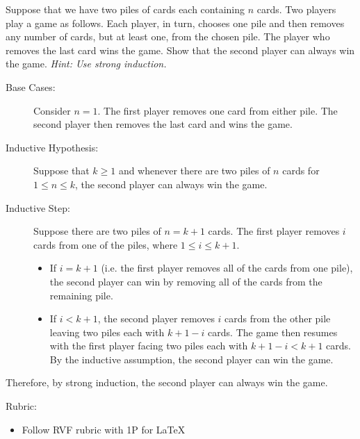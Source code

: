 \documentclass{article}
\theoremstyle{definition}
\begin{document}
\begin{question}
    Suppose that we have two piles of cards each containing $n$ cards. Two players play a game as follows. Each player, in turn, chooses one pile and then removes any number of cards, but at least one, from the chosen pile. The player who removes the last card wins the game. Show that the second player can always win the game. 
    \textit{Hint: Use strong induction.}
\end{question}
\begin{solution}
	\begin{description}
	\item[Base Cases: ] Consider $n=1$. The first player removes one card from either pile. The second player then removes the last card and wins the game.
	
	\item[Inductive Hypothesis: ] Suppose that $k\geq 1$ and whenever there are two piles of $n$ cards for $1\leq n\leq k$, the second player can always win the game.
	
	\item[Inductive Step: ] Suppose there are two piles of $n=k+1$ cards. The first player removes $i$ cards from one of the piles, where $1\leq i\leq k+1$. 
	\begin{itemize}
	\item If $i=k+1$ (i.e. the first player removes all of the cards from one pile), the second player can win by removing all of the cards from the remaining pile. 
	\item If $i<k+1$, the second player removes $i$ cards from the other pile leaving two piles each with $k+1-i$ cards. The game then resumes with the first player facing two piles each with $k+1-i<k+1$ cards. By the inductive assumption, the second player can win the game.
	\end{itemize}
	\end{description}
	Therefore, by strong induction, the second player can always win the game.
	
{\color{red} Rubric:
\begin{itemize}
\item Follow RVF rubric with 1P for \LaTeX
\end{itemize}}
\end{solution}
\end{document}
